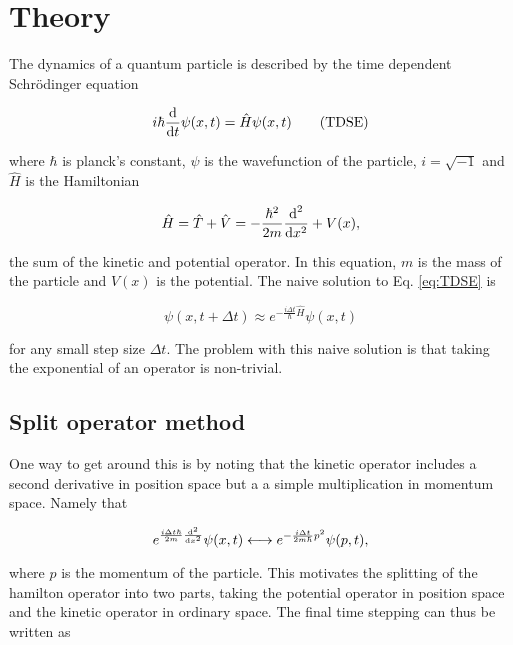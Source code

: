 \newpage
\section{Theory}
\label{sec:Theory}

The dynamics of a quantum particle is described by the time dependent Schrödinger equation

\begin{equation}
  \label{eq:TDSE}
  i \hbar \frac{\textnormal{d}}{\textnormal{d} t}\psi(x,t) = \hat{H}\psi(x,t) \tag{TDSE}
\end{equation}

where $\hbar$ is planck's constant, $\psi$ is the wavefunction of the particle, $i = \sqrt{-1}$ and $\hat{H}$ is the Hamiltonian

\begin{equation}
  \label{eq:ham}
  \hat{H} = \hat{T} + \hat{V} = - \frac{\hbar^2}{2m}\frac{\textnormal{d}^2}{\textnormal{d} x^2} + V(x),
\end{equation}

the sum of the kinetic and potential operator. In this equation, $m$ is the mass of the particle and $V(x)$ is the potential. The naive solution to Eq. \eqref{eq:TDSE} is

\begin{equation}
  \label{eq:TDSEsol}
  \psi(x,t+\Delta t) \approx e^{-\frac{i\Delta t}{\hbar}\hat{H}} \psi(x,t)
\end{equation}

for any small step size $\Delta t$. The problem with this naive solution is that taking the exponential of an operator is non-trivial.

\subsection{Split operator method}
\label{sec:splitOp}

One way to get around this is by noting that the kinetic operator includes a second derivative in position space but a a simple multiplication in momentum space. Namely that

\begin{equation*}
  e^{\frac{i \Delta t \hbar}{2m}\frac{\textnormal{d}^2}{\textnormal{d} x^2}}\psi(x,t) \longleftrightarrow e^{- \frac{i \Delta t }{2m\hbar}p^2}\psi(p,t),
\end{equation*}

where $p$ is the momentum of the particle. This motivates the splitting of the hamilton operator into two parts, taking the potential operator in position space and the kinetic operator in ordinary space. The final time stepping can thus be written as

